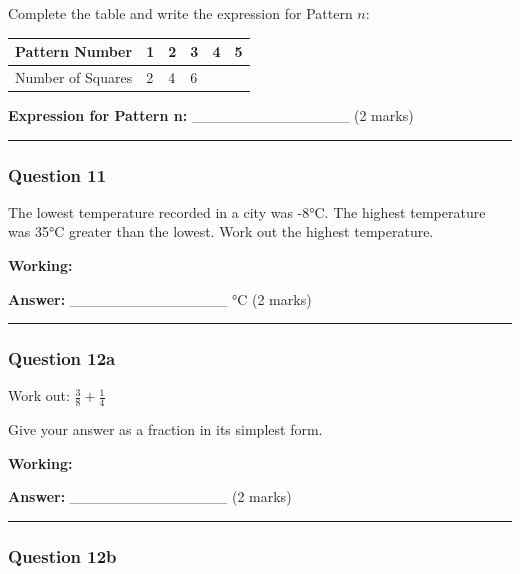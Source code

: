 Complete the table and write the expression for Pattern \(n\):

{\def\LTcaptype{none} %
\begin{longtable}[]{@{}llllll@{}}
\toprule\noalign{}
Pattern Number & 1 & 2 & 3 & 4 & 5 \\
\midrule\noalign{}
\endhead
\bottomrule\noalign{}
\endlastfoot
Number of Squares & 2 & 4 & 6 & & \\
\end{longtable}
}

\textbf{Expression for Pattern n:} \_\_\_\_\_\_\_\_\_\_\_\_\_\_\_ (2
marks)

\begin{center}\rule{0.5\linewidth}{0.5pt}\end{center}

\subsubsection{Question 11}\label{question-11}

The lowest temperature recorded in a city was -8°C. The highest
temperature was 35°C greater than the lowest. Work out the highest
temperature.

\textbf{Working:}

\textbf{Answer:} \_\_\_\_\_\_\_\_\_\_\_\_\_\_\_ °C (2 marks)

\begin{center}\rule{0.5\linewidth}{0.5pt}\end{center}

\subsubsection{Question 12a}\label{question-12a}

Work out: \(\frac{3}{8} + \frac{1}{4}\)

Give your answer as a fraction in its simplest form.

\textbf{Working:}

\textbf{Answer:} \_\_\_\_\_\_\_\_\_\_\_\_\_\_\_ (2 marks)

\begin{center}\rule{0.5\linewidth}{0.5pt}\end{center}

\subsubsection{Question 12b}\label{question-12b}

